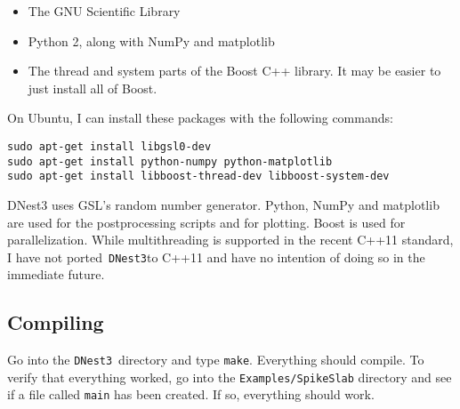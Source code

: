 \documentclass[a4paper, 11pt]{article}
\newcommand{\dnest}{{\tt DNest3}}
\begin{document}
\begin{itemize}
\item The GNU Scientific Library
\item Python 2, along with NumPy and matplotlib
\item The thread and system parts of the Boost C++ library.
It may be easier to just install all of Boost.
\end{itemize}

On Ubuntu, I can install these packages with the following commands:
\begin{verbatim}
sudo apt-get install libgsl0-dev
sudo apt-get install python-numpy python-matplotlib
sudo apt-get install libboost-thread-dev libboost-system-dev
\end{verbatim}

DNest3 uses GSL's random number generator. Python, NumPy and
matplotlib are used for the postprocessing scripts and for
plotting. Boost is used for parallelization. While multithreading is supported
in the recent C++11 standard, I have not ported~\dnest to C++11 and have no
intention of doing so in the immediate future.

\subsection{Compiling}
Go into the \dnest~directory and type {\tt make}. Everything should compile. To
verify that everything worked, go into the {\tt Examples/SpikeSlab} directory
and see if a file called {\tt main} has been created. If so, everything should
work.

\end{document}
